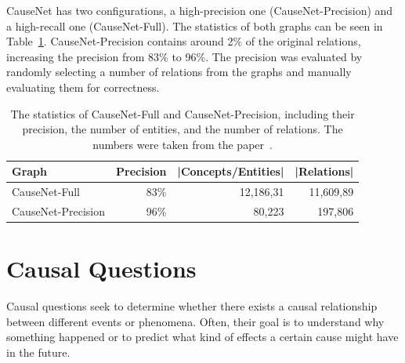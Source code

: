 CauseNet has two configurations, a high-precision one (CauseNet-Precision) and a high-recall one (CauseNet-Full).
The statistics of both graphs can be seen in Table~\ref{table-causenet}.
CauseNet-Precision contains around 2\% of the original relations, increasing 
the precision from 83\% to 96\%. The precision was evaluated by randomly selecting 
a number of relations from the graphs and manually evaluating them for correctness.

\begin{table}
\caption{The statistics of CauseNet-Full and CauseNet-Precision, including their precision,
the number of entities, and the number of relations. The numbers were taken from the paper~\cite{Heindorf2020Causenet}.}
\label{table-causenet}
\centering
\begin{tabular}{lrrr} 
			\toprule
			\textbf{Graph} & \textbf{Precision} & \textbf{|Concepts/Entities|} & \textbf{|Relations|}\\
			\toprule
		   CauseNet-Full & 83\% & 12,186,31& 11,609,89 \\
		   CauseNet-Precision & 96\% & 80,223 &	197,806\\
			\bottomrule
\end{tabular}
\end{table}

\section{Causal Questions}
\label{subsec:causal-questions}

Causal questions seek to determine whether there exists a causal relationship 
between different events or phenomena. Often, their goal is to understand why something 
happened or to predict what kind of effects a certain cause might have in the future.

